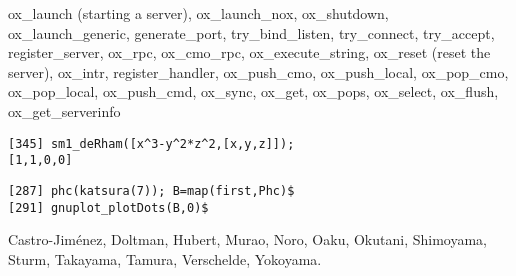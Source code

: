 \documentclass[twocolumn]{article}
\begin{document}
\medbreak
\noindent
{}

\noindent
{\color{red} ox\_launch} (starting a server), 
{\color{red} ox\_launch\_nox}, 
{\color{red} ox\_shutdown},
{\color{red} ox\_launch\_generic}, 
{\color{red} generate\_port}, 
{\color{red} try\_bind\_listen}, 
{\color{red} try\_connect}, 
{\color{red} try\_accept}, 
{\color{red} register\_server}, 
{\color{red} ox\_rpc}, 
{\color{red} ox\_cmo\_rpc}, 
{\color{red} ox\_execute\_string}, 
{\color{red} ox\_reset} (reset the server),
{\color{red} ox\_intr},
{\color{red} register\_handler}, 
{\color{red} ox\_push\_cmo}, 
{\color{red} ox\_push\_local},
{\color{red} ox\_pop\_cmo}, 
{\color{red} ox\_pop\_local}, 
{\color{red} ox\_push\_cmd}, 
{\color{red} ox\_sync},
{\color{red} ox\_get}, 
{\color{red} ox\_pops}, 
{\color{red} ox\_select}, 
{\color{red} ox\_flush},
{\color{red} ox\_get\_serverinfo}

\medbreak
\noindent
{}
{\footnotesize
\begin{verbatim}
[345] sm1_deRham([x^3-y^2*z^2,[x,y,z]]);
[1,1,0,0]
\end{verbatim}} 

\noindent
{\footnotesize \begin{verbatim}
[287] phc(katsura(7)); B=map(first,Phc)$
[291] gnuplot_plotDots(B,0)$
\end{verbatim} }

\epsfxsize=3cm
\begin{center}
\end{center}

\noindent


\medbreak
\noindent
{}
Castro-Jim\'enez, Doltman, Hubert, Murao, Noro, Oaku, Okutani, 
Shimoyama, Sturm, Takayama, Tamura, Verschelde, Yokoyama.

\medbreak
\noindent
\rightline{ {\color{red} {\tt http://www.openxm.org} }}
\end{document}
